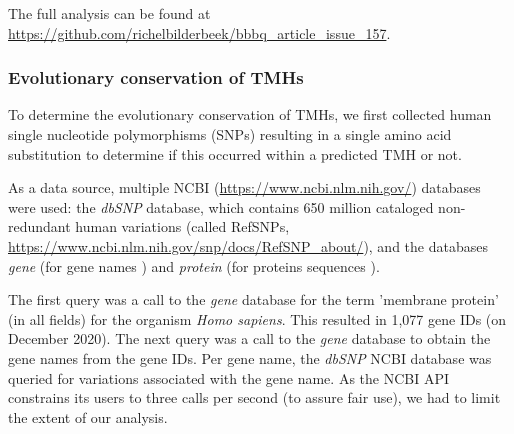 The full analysis can be found
at \url{https://github.com/richelbilderbeek/bbbq_article_issue_157}.

\subsubsection{Evolutionary conservation of TMHs}


To determine the evolutionary conservation of TMHs,
we first collected human single nucleotide polymorphisms (SNPs) 
resulting in a single amino acid substitution to determine if this occurred within a predicted TMH or not.


As a data source, multiple
NCBI (\url{https://www.ncbi.nlm.nih.gov/}) databases were used: 
the \emph{dbSNP} \cite{sherry2001dbsnp} database,
which contains 650 million 
cataloged non-redundant human variations (called RefSNPs,
\url{https://www.ncbi.nlm.nih.gov/snp/docs/RefSNP_about/}), and the databases \emph{gene} (for gene names \cite{brown2015gene})
and \emph{protein} (for proteins sequences \cite{sayers2010database}).


The first query was a call to the \emph{gene} database for the 
term 'membrane protein' (in all fields) 
for the organism \emph{Homo sapiens}.
This resulted in 1,077 gene IDs (on December 2020).
The next query was a call to the \emph{gene} database 
to obtain the gene names from the gene IDs.
Per gene name, the \emph{dbSNP} NCBI database was queried for 
variations associated with the gene name. 
As the NCBI API constrains its users to three calls per second
(to assure fair use), we had to limit the extent of our analysis.


